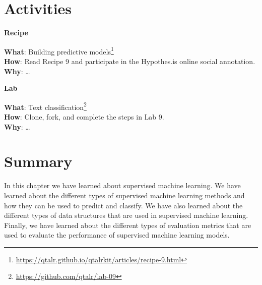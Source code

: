 \documentclass[
  letterpaper,
  DIV=11,
  numbers=noendperiod]{scrreprt}
\theoremstyle{definition}
\theoremstyle{remark}
\DeclareRobustCommand{\href}[2]{#2\footnote{\url{#1}}}
\begin{document}
\section*{Activities}\label{activities-7}


\begin{tcolorbox}[enhanced jigsaw, leftrule=.75mm, colframe=quarto-callout-color-frame, colback=white, rightrule=.15mm, opacityback=0, arc=.35mm, breakable, bottomrule=.15mm, left=2mm, toprule=.15mm]

\textbf{ Recipe}

\textbf{What}:
\href{https://qtalr.github.io/qtalrkit/articles/recipe-9.html}{Building
predictive models}\\
\textbf{How}: Read Recipe 9 and participate in the Hypothes.is online
social annotation.\\
\textbf{Why}:  \ldots{}

\end{tcolorbox}

\begin{tcolorbox}[enhanced jigsaw, leftrule=.75mm, colframe=quarto-callout-color-frame, colback=white, rightrule=.15mm, opacityback=0, arc=.35mm, breakable, bottomrule=.15mm, left=2mm, toprule=.15mm]

\textbf{ Lab}

\textbf{What}: \href{https://github.com/qtalr/lab-09}{Text
classification}\\
\textbf{How}: Clone, fork, and complete the steps in Lab 9.\\
\textbf{Why}:  \ldots{}

\end{tcolorbox}

\section*{Summary}\label{summary-8}


In this chapter we have learned about supervised machine learning. We
have learned about the different types of supervised machine learning
methods and how they can be used to predict and classify. We have also
learned about the different types of data structures that are used in
supervised machine learning. Finally, we have learned about the
different types of evaluation metrics that are used to evaluate the
performance of supervised machine learning models.
\end{document}
